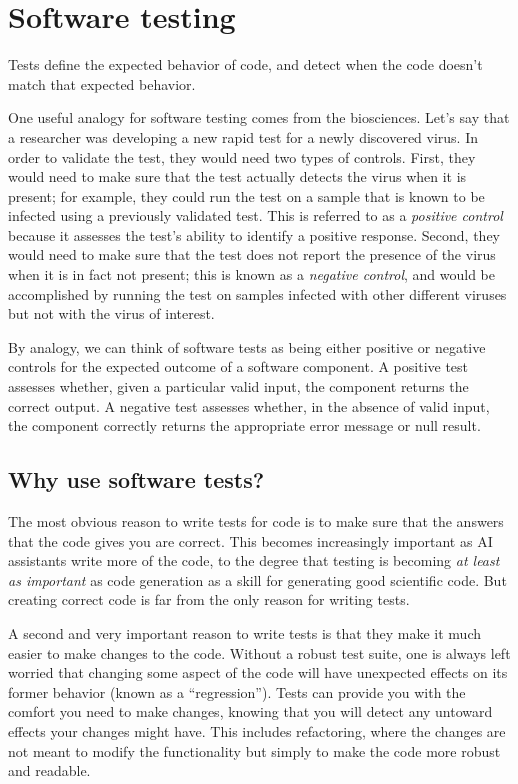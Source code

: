 \chapter{Software testing}

Tests define the expected behavior of code, and detect when the code doesn't match that expected behavior.

One useful analogy for software testing comes from the biosciences.
Let's say that a researcher was developing a new rapid test for a newly discovered virus.  In order to validate the test, they would need two types of controls.  First, they would need to make sure that the test actually detects the virus when it is present; for example, they could run the test on a sample that is known to be infected using a previously validated test.  This is referred to as a \textit{positive control} because it assesses the test's ability to identify a positive response.  Second, they would need to make sure that the test does not report the presence of the virus when it is in fact not present; this is known as a \textit{negative control}, and would be accomplished by running the test on samples infected with other different viruses but not with the virus of interest.

By analogy, we can think of software tests as being either positive or negative controls for the expected outcome of a software component.
A positive test assesses whether, given a particular valid input, the component returns the correct output.
A negative test assesses whether, in the absence of valid input, the component correctly returns the appropriate error message or null result.

\section{Why use software tests?}

The most obvious reason to write tests for code is to make sure that the answers that the code gives you are correct.
This becomes increasingly important as AI assistants write more of the code, to the degree that testing is becoming \textit{at least as important} as code generation as a skill for generating good scientific code.
But creating correct code is far from the only reason for writing tests.

A second and very important reason to write tests is that they make it much easier to make changes to the code.
Without a robust test suite, one is always left worried that changing some aspect of the code will have unexpected effects on its former behavior (known as a ``regression'').
Tests can provide you with the comfort you need to make changes, knowing that you will detect any untoward effects your changes might have.
This includes refactoring, where the changes are not meant to modify the functionality but simply to make the code more robust and readable.

